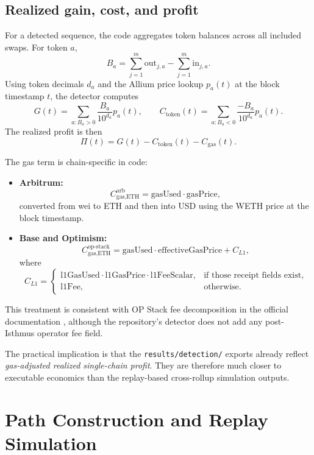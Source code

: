 \documentclass[11pt]{article}
\begin{document}
\subsection{Realized gain, cost, and profit}

For a detected sequence, the code aggregates token balances across all included swaps. For token \(a\),
\[
B_a = \sum_{j=1}^{m} \mathrm{out}_{j,a} - \sum_{j=1}^{m} \mathrm{in}_{j,a}.
\]
Using token decimals \(d_a\) and the Allium price lookup \(p_a(t)\) at the block timestamp \(t\), the detector computes
\[
G(t) = \sum_{a: B_a>0} \frac{B_a}{10^{d_a}} p_a(t),
\qquad
C_{\text{token}}(t) = \sum_{a: B_a<0} \frac{-B_a}{10^{d_a}} p_a(t).
\]
The realized profit is then
\[
\Pi(t) = G(t) - C_{\text{token}}(t) - C_{\text{gas}}(t).
\]

The gas term is chain-specific in code:
\begin{itemize}[leftmargin=1.5em]
    \item \textbf{Arbitrum:}
    \[
    C_{\text{gas,ETH}}^{\text{arb}} = \mathrm{gasUsed} \cdot \mathrm{gasPrice},
    \]
    converted from wei to ETH and then into USD using the WETH price at the block timestamp.
    \item \textbf{Base and Optimism:}
    \[
    C_{\text{gas,ETH}}^{\text{op-stack}} =
    \mathrm{gasUsed} \cdot \mathrm{effectiveGasPrice} + C_{L1},
    \]
    where
    \[
    C_{L1} =
    \begin{cases}
    \mathrm{l1GasUsed} \cdot \mathrm{l1GasPrice} \cdot \mathrm{l1FeeScalar}, & \text{if those receipt fields exist},\\
    \mathrm{l1Fee}, & \text{otherwise.}
    \end{cases}
    \]
\end{itemize}

This treatment is consistent with OP Stack fee decomposition in the official documentation \cite{opfees,basedocs}, although the repository's detector does not add any post-Isthmus operator fee field.

The practical implication is that the \texttt{results/detection/} exports already reflect \emph{gas-adjusted realized single-chain profit}. They are therefore much closer to executable economics than the replay-based cross-rollup simulation outputs.

\section{Path Construction and Replay Simulation}
\end{document}
